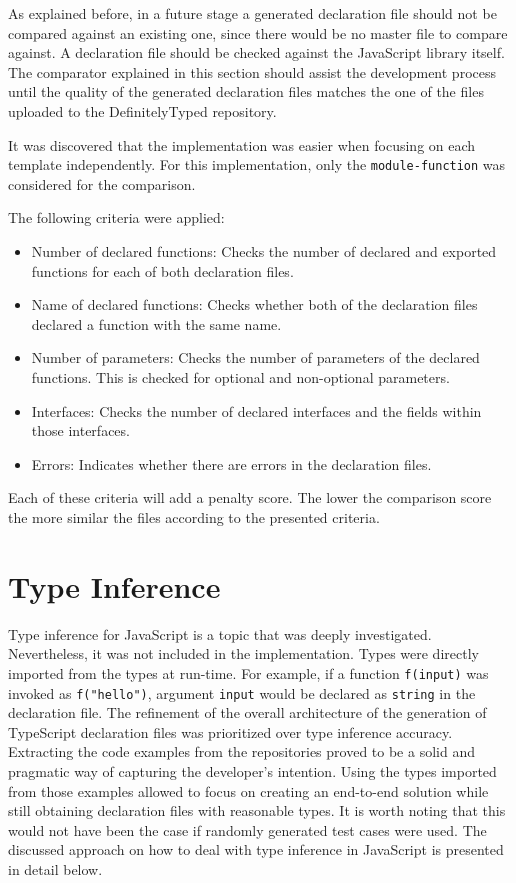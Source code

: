 As explained before, in a future stage a generated declaration file should not be compared against an existing one, since there would be no master file to compare against. A declaration file should be checked against the JavaScript library itself. The comparator explained in this section should assist the development process until the quality of the generated declaration files matches the one of the files uploaded to the DefinitelyTyped repository.

It was discovered that the implementation was easier when focusing on each template independently. For this implementation, only the \texttt{module-function} was considered for the comparison.

The following criteria were applied:
\begin{itemize}
  \item Number of declared functions: Checks the number of declared and exported functions for each of both declaration files.
  \item Name of declared functions: Checks whether both of the declaration files declared a function with the same name.
  \item Number of parameters: Checks the number of parameters of the declared functions. This is checked for optional and non-optional parameters.
  \item Interfaces: Checks the number of declared interfaces and the fields within those interfaces.
  \item Errors: Indicates whether there are errors in the declaration files.
\end{itemize}

Each of these criteria will add a penalty score. The lower the comparison score the more similar the files according to the presented criteria.

\section{Type Inference}
Type inference for JavaScript is a topic that was deeply investigated. Nevertheless, it was not included in the implementation. Types were directly imported from the types at run-time. For example, if a function \texttt{f(input)} was invoked as \texttt{f("hello")}, argument \texttt{input} would be declared as \texttt{string} in the declaration file.
The refinement of the overall architecture of the generation of TypeScript declaration files was prioritized over type inference accuracy. Extracting the code examples from the repositories proved to be a solid and pragmatic way of capturing the developer's intention. Using the types imported from those examples allowed to focus on creating an end-to-end solution while still obtaining declaration files with reasonable types. It is worth noting that this would not have been the case if randomly generated test cases were used.
The discussed approach on how to deal with type inference in JavaScript is presented in detail below.

